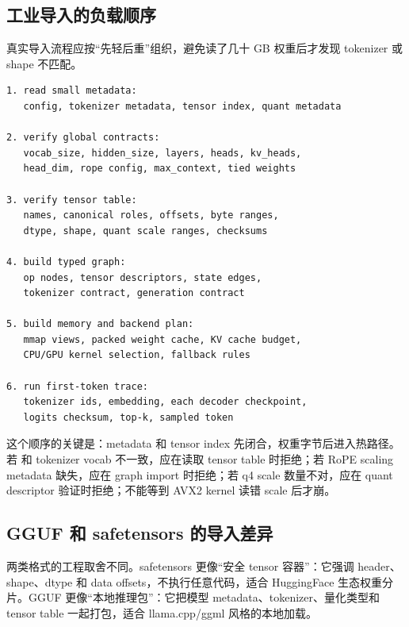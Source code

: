 \subsection{工业导入的负载顺序}

真实导入流程应按“先轻后重”组织，避免读了几十 GB 权重后才发现 tokenizer 或 shape 不匹配。

\begin{lstlisting}[numbers=none,caption={真实模型导入的推荐顺序}]
1. read small metadata:
   config, tokenizer metadata, tensor index, quant metadata

2. verify global contracts:
   vocab_size, hidden_size, layers, heads, kv_heads,
   head_dim, rope config, max_context, tied weights

3. verify tensor table:
   names, canonical roles, offsets, byte ranges,
   dtype, shape, quant scale ranges, checksums

4. build typed graph:
   op nodes, tensor descriptors, state edges,
   tokenizer contract, generation contract

5. build memory and backend plan:
   mmap views, packed weight cache, KV cache budget,
   CPU/GPU kernel selection, fallback rules

6. run first-token trace:
   tokenizer ids, embedding, each decoder checkpoint,
   logits checksum, top-k, sampled token
\end{lstlisting}

这个顺序的关键是：metadata 和 tensor index 先闭合，权重字节后进入热路径。若  和 tokenizer vocab 不一致，应在读取 tensor table 时拒绝；若 RoPE scaling metadata 缺失，应在 graph import 时拒绝；若 q4 scale 数量不对，应在 quant descriptor 验证时拒绝；不能等到 AVX2 kernel 读错 scale 后才崩。

\subsection{GGUF 和 safetensors 的导入差异}

两类格式的工程取舍不同。safetensors 更像“安全 tensor 容器”：它强调 header、shape、dtype 和 data offsets，不执行任意代码，适合 HuggingFace 生态权重分片。GGUF 更像“本地推理包”：它把模型 metadata、tokenizer、量化类型和 tensor table 一起打包，适合 llama.cpp/ggml 风格的本地加载。

